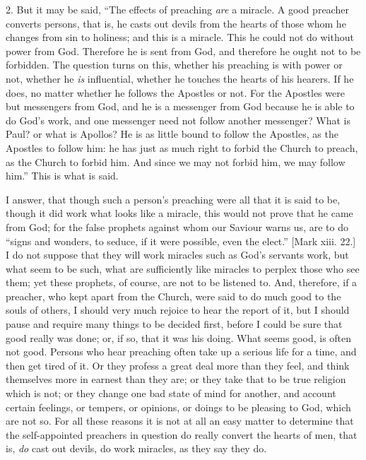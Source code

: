 2. But it may be said, ``The effects of preaching \emph{are} a
miracle. A good preacher converts persons, that is, he casts out
devils from the hearts of those whom he changes from sin to holiness;
and this is a miracle. This he could not do without power from God.
Therefore he is sent from God, and therefore he ought not to be
forbidden. The question turns on this, whether his preaching is with
power or not, whether he \emph{is} influential, whether he touches the
hearts of his hearers. If he does, no matter whether he follows the
Apostles or not. For the Apostles were but messengers from God, and he
is a messenger from God because he is able to do God's work, and one
messenger need not follow another messenger? What is Paul? or what is
Apollos? He is as little bound to follow the Apostles, as the Apostles
to follow him: he has just as much right to forbid the Church to
preach, as the Church to forbid him. And since we may not forbid him,
we may follow him.'' This is what is said.

I answer, that though such a person's preaching were all that it is
said to be, though it did work what looks like a miracle, this would
not prove that he came from God; for the false prophets against whom
our Saviour warns us, are to do ``signs and wonders, to seduce, if
it were possible, even the elect.'' [Mark xiii. 22.] I do not
suppose that they will work miracles such as God's servants work, but
what seem to be such, what are sufficiently like miracles to perplex
those who see them; yet these prophets, of course, are not to be
listened to. And, therefore, if a preacher, who kept apart from the
Church, were said to do much good to the souls of others, I should
very much rejoice to hear the report of it, but I should pause and
require many things to be decided first, before I could be sure that
good really was done; or, if so, that it was his doing. What seems
good, is often not good. Persons who hear preaching often take up a
serious life for a time, and then get tired of it. Or they profess a
great deal more than they feel, and think themselves more in earnest
than they are; or they take that to be true religion which is not; or
they change one bad state of mind for another, and account certain
feelings, or tempers, or opinions, or doings to be pleasing to God,
which are not so. For all these reasons it is not at all an easy
matter to determine that the self-appointed preachers in question do
really convert the hearts of men, that is, \emph{do} cast out devils,
do work miracles, as they say they do.

